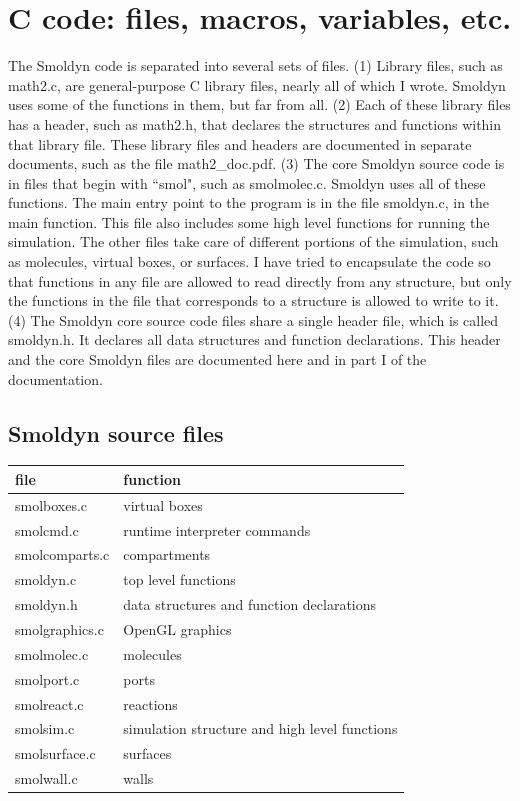 \documentclass {scrbook}
\begin{document}
\chapter{C code: files, macros, variables, etc.}

The Smoldyn code is separated into several sets of files. (1) Library files, such as math2.c, are general-purpose C library files, nearly all of which I wrote. Smoldyn uses some of the functions in them, but far from all. (2) Each of these library files has a header, such as math2.h, that declares the structures and functions within that library file. These library files and headers are documented in separate documents, such as the file math2\_doc.pdf. (3) The core Smoldyn source code is in files that begin with ``smol", such as smolmolec.c. Smoldyn uses all of these functions. The main entry point to the program is in the file smoldyn.c, in the main function. This file also includes some high level functions for running the simulation. The other files take care of different portions of the simulation, such as molecules, virtual boxes, or surfaces. I have tried to encapsulate the code so that functions in any file are allowed to read directly from any structure, but only the functions in the file that corresponds to a structure is allowed to write to it. (4) The Smoldyn core source code files share a single header file, which is called smoldyn.h. It declares all data structures and function declarations. This header and the core Smoldyn files are documented here and in part I of the documentation.

\section{Smoldyn source files}

\begin{longtable}[c]{ll}
file & function\\
\hline
smolboxes.c & virtual boxes\\
smolcmd.c & runtime interpreter commands\\
smolcomparts.c & compartments\\
smoldyn.c & top level functions\\
smoldyn.h & data structures and function declarations\\
smolgraphics.c & OpenGL graphics\\
smolmolec.c & molecules\\
smolport.c & ports\\
smolreact.c & reactions\\
smolsim.c & simulation structure and high level functions\\
smolsurface.c & surfaces\\
smolwall.c & walls\\
\end{longtable}
\end{document}

